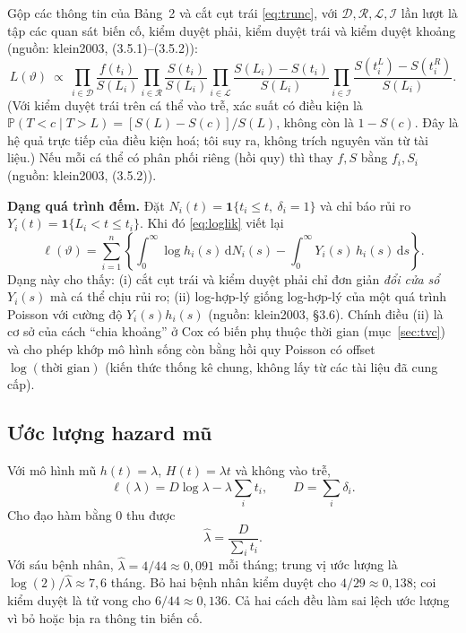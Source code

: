 \documentclass[11pt,a4paper,notitlepage]{report}
\newcommand{\Prob}{\mathbb{P}}
\newcommand{\ind}{\mathbf{1}}
\newcommand{\dd}{\,\mathrm{d}}
\providecommand{\nguon}[1]{(nguồn: #1)}
\begin{document}
\begin{bosung}
Gộp các thông tin của Bảng~2 và cắt cụt trái \eqref{eq:trunc}, với $\mathcal D,\mathcal R,\mathcal L,\mathcal I$ lần lượt là tập các quan sát biến cố, kiểm duyệt phải, kiểm duyệt trái và kiểm duyệt khoảng
\nguon{klein2003, (3.5.1)--(3.5.2)}:
\begin{equation}
L(\vartheta)\ \propto\ \prod_{i\in\mathcal D}\frac{f(t_i)}{S(L_i)}\prod_{i\in\mathcal R}\frac{S(t_i)}{S(L_i)}
\prod_{i\in\mathcal L}\frac{S(L_i)-S(t_i)}{S(L_i)}\prod_{i\in\mathcal I}\frac{S(t_i^L)-S(t_i^R)}{S(L_i)}.
\end{equation}
(Với kiểm duyệt trái trên cá thể vào trễ, xác suất có điều kiện là $\Prob(T<c\mid T>L)=[S(L)-S(c)]/S(L)$, không còn là $1-S(c)$. Đây là hệ quả trực tiếp của điều kiện hoá; tôi suy ra, không trích nguyên văn từ tài liệu.)
Nếu mỗi cá thể có phân phối riêng (hồi quy) thì thay $f,S$ bằng $f_i,S_i$ \nguon{klein2003, (3.5.2)}.

\textbf{Dạng quá trình đếm.} Đặt $N_i(t)=\ind\{t_i\le t,\ \delta_i=1\}$ và chỉ báo rủi ro $Y_i(t)=\ind\{L_i<t\le t_i\}$. Khi đó \eqref{eq:loglik} viết lại
\[
\ell(\vartheta)=\sum_{i=1}^n\left\{\int_0^\infty\log h_i(s)\dd N_i(s)-\int_0^\infty Y_i(s)\,h_i(s)\dd s\right\}.
\]
Dạng này cho thấy: (i) cắt cụt trái và kiểm duyệt phải chỉ đơn giản \emph{đổi cửa sổ} $Y_i(s)$ mà cá thể chịu rủi ro; (ii) log-hợp-lý giống log-hợp-lý của một quá trình Poisson với cường độ $Y_i(s)h_i(s)$
\nguon{klein2003, \S3.6}. Chính điều (ii) là cơ sở của cách ``chia khoảng'' ở Cox có biến phụ thuộc thời gian (mục~\ref{sec:tvc}) và cho phép khớp mô hình sống còn bằng hồi quy Poisson có offset $\log(\text{thời gian})$
(kiến thức thống kê chung, không lấy từ các tài liệu đã cung cấp).
\end{bosung}

\subsection{Ước lượng hazard mũ}\label{sec:expmle}

Với mô hình mũ $h(t)=\lambda$, $H(t)=\lambda t$ và không vào trễ,
\[
\ell(\lambda)=D\log\lambda-\lambda\sum_i t_i,\qquad D=\sum_i\delta_i.
\]
Cho đạo hàm bằng 0 thu được
\begin{equation}\label{eq:lamhat}
\hat\lambda=\frac{D}{\sum_i t_i}.
\end{equation}
Với sáu bệnh nhân, $\hat\lambda=4/44\approx0{,}091$ mỗi tháng; trung vị ước lượng là $\log(2)/\hat\lambda\approx7{,}6$ tháng. Bỏ
hai bệnh nhân kiểm duyệt cho $4/29\approx0{,}138$; coi kiểm duyệt là tử vong cho $6/44\approx0{,}136$. Cả hai
cách đều làm sai lệch ước lượng vì bỏ hoặc bịa ra thông tin biến cố.
\end{document}

